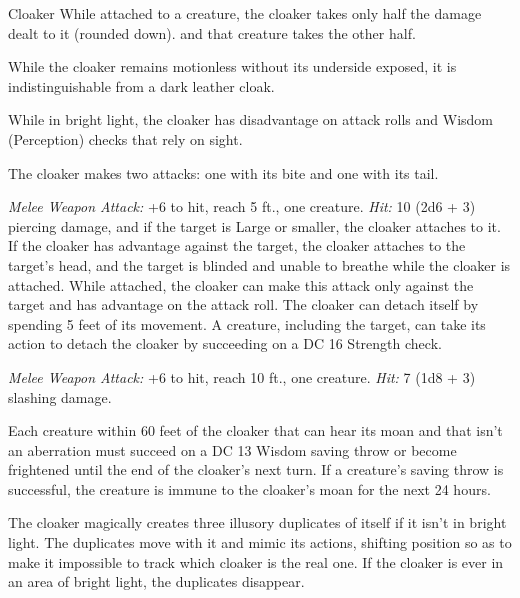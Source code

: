 \documentclass[10pt,a4paper,twoside,fancy,bg=print,twocolumn,openany,nodeprecatedcode]{dndbook}
\begin{document}
\begin{DndMonster}[float=t]{Cloaker}
\DndMonsterBasics[
armor-class = {14 (natural armor)},
hit-points = {\DndDice{12d10 + 12}},
speed = {10 ft., fly 40 ft.}
]
\DndMonsterAbilityScores[
 str = 17,
 dex = 15,
 con = 12,
 int = 13,
 wis = 12,
 cha = 14
]
\DndMonsterDetails[
skills = {Stealth +5},
senses = {darkvision 60 ft., passive perception 11},
languages = {Deep Speech, Undercommon},
challenge = 8,
]
While attached to a creature, the cloaker takes only half the damage dealt to it (rounded down). and that creature takes the other half.

While the cloaker remains motionless without its underside exposed, it is indistinguishable from a dark leather cloak.

While in bright light, the cloaker has disadvantage on attack rolls and Wisdom (Perception) checks that rely on sight.

The cloaker makes two attacks: one with its bite and one with its tail.

\textsl{Melee Weapon Attack:} +6 to hit, reach 5 ft., one creature. \textsl{Hit:} 10 (2d6 + 3) piercing damage, and if the target is Large or smaller, the cloaker attaches to it. If the cloaker has advantage against the target, the cloaker attaches to the target's head, and the target is blinded and unable to breathe while the cloaker is attached. While attached, the cloaker can make this attack only against the target and has advantage on the attack roll. The cloaker can detach itself by spending 5 feet of its movement. A creature, including the target, can take its action to detach the cloaker by succeeding on a DC 16 Strength check.

\textsl{Melee Weapon Attack:} +6 to hit, reach 10 ft., one creature. \textsl{Hit:} 7 (1d8 + 3) slashing damage.

Each creature within 60 feet of the cloaker that can hear its moan and that isn't an aberration must succeed on a DC 13 Wisdom saving throw or become frightened until the end of the cloaker's next turn. If a creature's saving throw is successful, the creature is immune to the cloaker's moan for the next 24 hours.

The cloaker magically creates three illusory duplicates of itself if it isn't in bright light. The duplicates move with it and mimic its actions, shifting position so as to make it impossible to track which cloaker is the real one. If the cloaker is ever in an area of bright light, the duplicates disappear.


\end{DndMonster}
\end{document}
